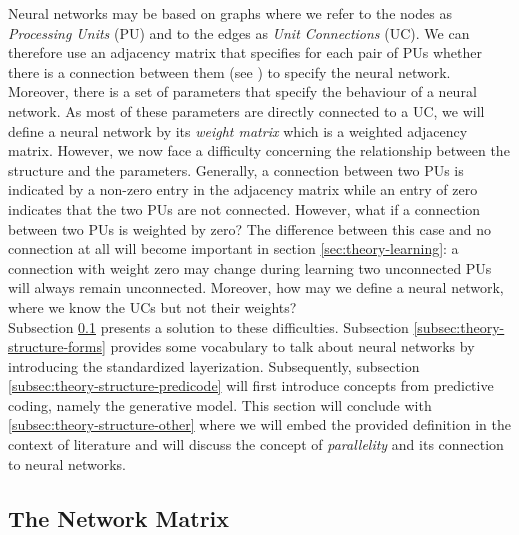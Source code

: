 \documentclass[a4paper,11pt]{report}
\begin{document}
\begin{Par}\label{theory-structure:intro}
Neural networks may be based on graphs where we refer to the nodes as \emph{Processing Units} (PU) and to the edges as \emph{Unit Connections} (UC). We can therefore use an adjacency matrix that specifies for each pair of PUs whether there is a connection between them (see ) to specify the neural network.\\
Moreover, there is a set of parameters that specify the behaviour of a neural network. As most of these parameters are directly connected to a UC, we will define a neural network by its \emph{weight matrix} which is a weighted adjacency matrix. However, we now face a difficulty concerning the relationship between the structure and the parameters. Generally, a connection between two PUs is indicated by a non-zero entry in the adjacency matrix while an entry of zero indicates that the two PUs are not connected. However, what if a connection between two PUs is weighted by zero? The difference between this case and no connection at all will become important in section \ref{sec:theory-learning}: a connection with weight zero may change during learning two unconnected PUs will always remain unconnected. Moreover, how may we define a neural network, where we know the UCs but not their weights?\\
Subsection \ref{subsec:theory-structure-matrix} presents a solution to these difficulties. Subsection \ref{subsec:theory-structure-forms} provides some vocabulary to talk about neural networks by introducing the standardized layerization. Subsequently, subsection \ref{subsec:theory-structure-predicode} will first introduce concepts from predictive coding, namely the generative model. This section will conclude with \ref{subsec:theory-structure-other} where we will embed the provided definition in the context of literature and will discuss the concept of \emph{parallelity} and its connection to neural networks.
\end{Par}

\subsection{The Network Matrix}\label{subsec:theory-structure-matrix}
\end{document}
